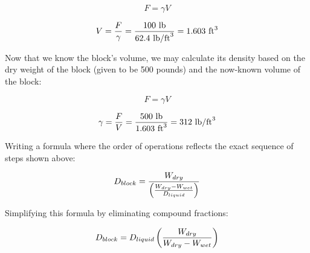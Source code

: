 $$F = \gamma V$$

$$V = {F \over \gamma} = {100 \hbox{ lb} \over 62.4 \hbox{ lb/ft}^3} = 1.603 \hbox{ ft}^3$$

Now that we know the block's volume, we may calculate its density based on the dry weight of the block (given to be 500 pounds) and the now-known volume of the block:

$$F = \gamma V$$

$$\gamma = {F \over V} = {500 \hbox{ lb} \over 1.603 \hbox{ ft}^3} = 312 \hbox{ lb/ft}^3$$

\vskip 10pt

Writing a formula where the order of operations reflects the exact sequence of steps shown above:

$$D_{block} = {W_{dry} \over \left({{W_{dry} - W_{wet}} \over D_{liquid}}\right)}$$

\vskip 10pt

Simplifying this formula by eliminating compound fractions:

$$D_{block} = D_{liquid}\left({W_{dry} \over {W_{dry} - W_{wet}}}\right)$$




